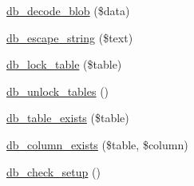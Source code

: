 \begin{Indent}{\bf }
\begin{CompactItemize}
\item 
\hyperlink{group__database_g1ed4215d202290ca055de8f6cf3b6f08}{db\_\-decode\_\-blob} (\$data)
\item 
\hyperlink{group__database_gf7e6977f59f6a23327521ae3a89346f5}{db\_\-escape\_\-string} (\$text)
\item 
\hyperlink{group__database_g8584042b05393a82b7d06c2ee6cf95ed}{db\_\-lock\_\-table} (\$table)
\item 
\hyperlink{group__database_g827df02252c1d606c685b768807b7181}{db\_\-unlock\_\-tables} ()
\item 
\hyperlink{group__database_g78809300cee80db034832825aed55b70}{db\_\-table\_\-exists} (\$table)
\item 
\hyperlink{group__database_g3d649bb8d8b9a7222c0bded9d7e2785a}{db\_\-column\_\-exists} (\$table, \$column)
\item 
\hyperlink{group__database_g7ba830a719ea0847a983f70ade811880}{db\_\-check\_\-setup} ()
\end{CompactItemize}
\end{Indent}
